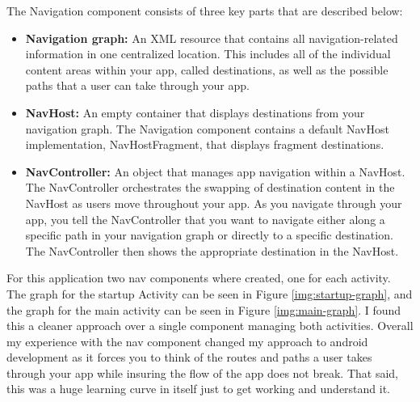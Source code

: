 The Navigation component consists of three key parts that are described below:
\begin{itemize}
    \item \textbf{Navigation graph:} An XML resource that contains all navigation-related information in one centralized location. This includes all of the individual content areas within your app, called destinations, as well as the possible paths that a user can take through your app.
    \item \textbf{NavHost:} An empty container that displays destinations from your navigation graph. The Navigation component contains a default NavHost implementation, NavHostFragment, that displays fragment destinations.
    \item \textbf{NavController:} An object that manages app navigation within a NavHost. The NavController orchestrates the swapping of destination content in the NavHost as users move throughout your app.
    As you navigate through your app, you tell the NavController that you want to navigate either along a specific path in your navigation graph or directly to a specific destination. The NavController then shows the appropriate destination in the NavHost.
\end{itemize}
For this application two nav components where created, one for each activity. The graph for the startup Activity can be seen in Figure \ref{img:startup-graph}, and the graph for the main activity can be seen in Figure \ref{img:main-graph}. I found this a cleaner approach over a single component managing both activities. Overall my experience with the nav component changed my approach to android development as it forces you to think of the routes and paths a user takes through your app while insuring the flow of the app does not break. That said, this was a huge learning curve in itself just to get working and understand it.


